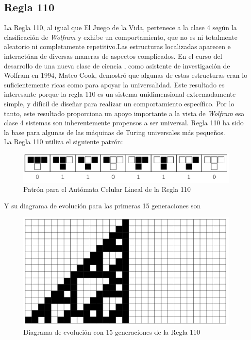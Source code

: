 \subsection{Regla 110}
La Regla 110, al igual que El Juego de la Vida, pertenece a la clase 4 según la clasificación de \textit{Wolfram} y exhibe un  comportamiento, que no es ni totalmente aleatorio ni completamente repetitivo.Las estructuras localizadas aparecen e interactúan de diversas maneras de aspectos complicados. En el curso del desarrollo de una nueva clase de ciencia , como asistente de investigación de Wolfram en 1994, Mateo Cook, demostró que algunas de estas estructuras eran lo suficientemente ricas como para apoyar la universalidad. Este resultado es interesante porque la regla 110 es un sistema unidimensional extremadamente simple, y difícil de diseñar para realizar un comportamiento específico. Por lo tanto, este resultado proporciona un apoyo importante a la vista de \textit{Wolfram} esa clase 4 sistemas son inherentemente propensos a ser universal. Regla 110 ha sido la base para algunas de las máquinas de Turing universales más pequeños.\\

La Regla 110 utiliza el siguiente patrón:

\begin{figure}[H]
\centering
\includegraphics[scale=0.7]{imagenes/rule_110_1.png}
\caption{Patrón para el Autómata Celular Lineal de la Regla 110}
\end{figure}

Y su diagrama de evolución para las primeras 15 generaciones son

\begin{figure}[H]
\centering
\includegraphics[scale=0.7]{imagenes/rule_110_2.png}
\caption{Diagrama de evolución con 15 generaciones de la Regla 110}
\end{figure}

